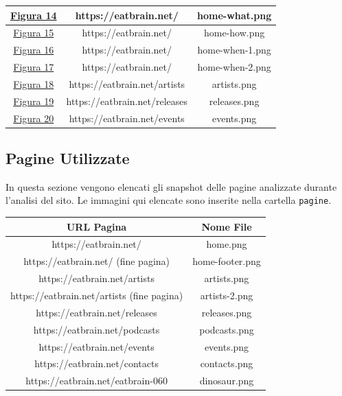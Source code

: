 \documentclass[10pt,a4paper]{article}
\begin{document}
\begin{center}
\begin{tabular}{| c | c | c |}
	\hyperref[img-home-what]{Figura 14} & https://eatbrain.net/ & home-what.png \\\hline
	\hyperref[img-home-how]{Figura 15} & https://eatbrain.net/ & home-how.png \\\hline
	\hyperref[home-when-1]{Figura 16} & https://eatbrain.net/ & home-when-1.png \\\hline
	\hyperref[home-when-2]{Figura 17} & https://eatbrain.net/ & home-when-2.png \\\hline
	\hyperref[img-artists]{Figura 18} & https://eatbrain.net/artists & artists.png \\\hline
	\hyperref[img-releases]{Figura 19} & https://eatbrain.net/releases & releases.png \\\hline
	\hyperref[img-events]{Figura 20} & https://eatbrain.net/events & events.png \\\hline
\end{tabular}
\end{center}
\newpage
\subsection{Pagine Utilizzate}
In questa sezione vengono elencati gli snapshot delle pagine analizzate durante l'analisi del sito. Le immagini qui elencate sono inserite nella cartella \texttt{pagine}.\\
\begin{center}
\setlength{\tabcolsep}{15pt}
\begin{tabular}{| c | c |}
	\hline
	\textbf{URL Pagina}  & \textbf{Nome File} \\\hline
	https://eatbrain.net/ & home.png \\\hline
	https://eatbrain.net/ (fine pagina) & home-footer.png \\\hline
	https://eatbrain.net/artists & artists.png \\\hline
	https://eatbrain.net/artists (fine pagina) & artists-2.png \\\hline
	https://eatbrain.net/releases & releases.png \\\hline
	https://eatbrain.net/podcasts & podcasts.png \\\hline
	https://eatbrain.net/events & events.png \\\hline
	https://eatbrain.net/contacts & contacts.png \\\hline
	https://eatbrain.net/eatbrain-060 & dinosaur.png \\\hline
\end{tabular}
\end{center}
\end{document}
